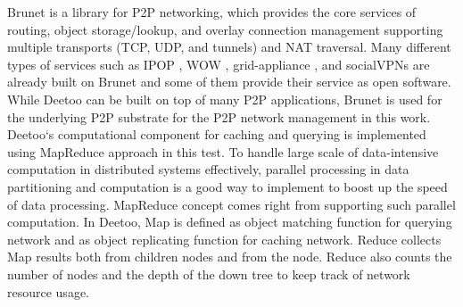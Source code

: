 \documentclass[9.5pt,journal,final,finalsubmission,twocolumn]{IEEEtran}
\begin{document}
Brunet is a library for P2P networking, 
which provides the core services of routing, object
storage/lookup, and overlay connection management supporting multiple 
transports (TCP, UDP, and tunnels) and NAT traversal.
Many different types of services such as IPOP \cite{ipop}, WOW \cite{WOW}, 
grid-appliance \cite{grid-appliance}, and socialVPNs \cite{socialvpns} are 
already built on Brunet and some of them provide their service as 
open software.
While Deetoo can be built on top of many P2P applications, 
Brunet is used for the underlying P2P substrate for the P2P network 
management in this work. 
Deetoo`s computational component for caching and querying is implemented 
using MapReduce approach in this test. To handle large scale of data-intensive computation
in distributed systems effectively, parallel processing in data partitioning and
computation is a good way to implement to boost up the speed of data processing.
MapReduce concept comes right from supporting such parallel computation. 
In Deetoo, Map is defined as object matching function for querying network and 
as object replicating function for caching network. 
Reduce collects Map results both from children nodes and from the node.
Reduce also counts the number of nodes and the depth of the down tree to 
keep track of network resource usage.

\end{document}
